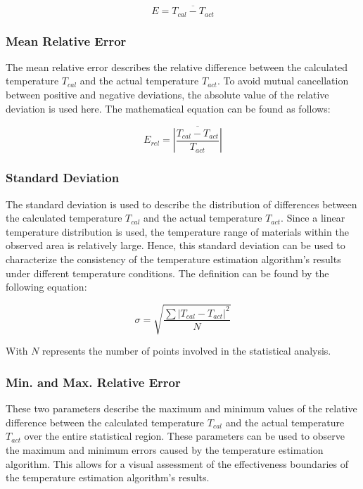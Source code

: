 \begin{equation}
    {E} = \overline{T_{cal} - T_{act}} 
\end{equation}

\subsubsection{Mean Relative Error}
The mean relative error describes the relative difference between the calculated 
temperature $T_{cal}$ and the actual temperature $T_{act}$. To avoid mutual 
cancellation between positive and negative deviations, the absolute value of 
the relative deviation is used here. The mathematical equation can be found as follows:

\begin{equation}
    {E}_{rel} = \overline{\left\lvert \frac{T_{cal} - T_{act}}{T_{act}}\right\rvert }
\end{equation}

\subsubsection{Standard Deviation}
The standard deviation is used to describe the distribution of differences 
between the calculated temperature $T_{cal}$ and the actual 
temperature $T_{act}$. Since a linear temperature distribution is used, the 
temperature range of materials within the observed area is relatively large. 
Hence, this standard deviation can be used to characterize the consistency of the 
temperature estimation algorithm's results under different temperature conditions.
The definition can be found by the following equation:

\begin{equation}
    \sigma = \sqrt{\frac{\sum {\left\lvert T_{cal} - T_{act}\right\rvert }^2}{N}} 
\end{equation}

With $N$ represents the number of points involved in the statistical analysis.

\subsubsection{Min. and Max. Relative Error}
These two parameters describe the maximum and minimum values of the relative 
difference between the calculated temperature $T_{cal}$ and the actual temperature 
$T_{act}$ over the entire statistical region. These parameters can be used to 
observe the maximum and minimum errors caused by the temperature estimation 
algorithm. This allows for a visual assessment of the effectiveness boundaries 
of the temperature estimation algorithm's results.



